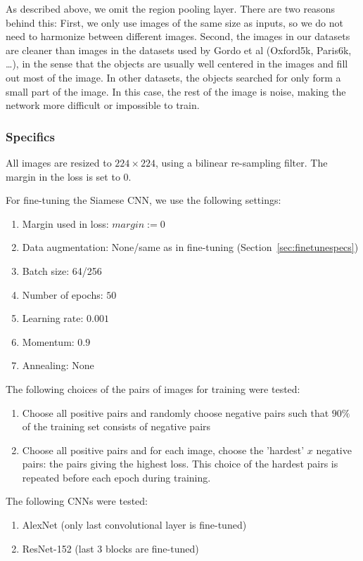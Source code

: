 \documentclass[fleqn]{article}
\begin{document}
As described above, we omit the region pooling layer. There are two
reasons behind this: First, we only use images of the same size
as inputs, so we do not need to harmonize between different images.
Second, the images in our datasets are cleaner than images in the
datasets used by Gordo et al (Oxford5k, Paris6k, \dots), in the sense
that the objects are usually well centered in the images and fill out
most of the image. In other datasets, the objects searched for
only form a small part of the image. In this case, the rest of the image
is noise, making the network more difficult or impossible to train.

\subsubsection{Specifics}
All images are resized to $224 \times 224$, using a bilinear
re-sampling filter. The margin in the loss is set to 0.

For fine-tuning the Siamese CNN, we use the following settings:
\begin{enumerate}
    \item Margin used in loss: $margin:=0$
    \item Data augmentation: None/same as in fine-tuning
    (Section~\ref{sec:finetunespecs})
    \item Batch size: 64/256
    \item Number of epochs: $50$
    \item Learning rate: $0.001$
    \item Momentum: $0.9$
    \item Annealing: None
\end{enumerate}

The following choices of the pairs of images for training were tested:
\begin{enumerate}
    \item Choose all positive pairs and randomly choose negative pairs
    such that $90\%$ of the training set consists of negative pairs
    \item Choose all positive pairs and for each image, choose the
    'hardest' $x$ negative pairs: the pairs giving the highest loss.
    This choice of the hardest pairs is repeated before each epoch
    during training.
\end{enumerate}

The following CNNs were tested:
\begin{enumerate}
    \item AlexNet (only last convolutional layer is fine-tuned)
    \item ResNet-152 (last 3 blocks are fine-tuned)
\end{enumerate}
\end{document}
